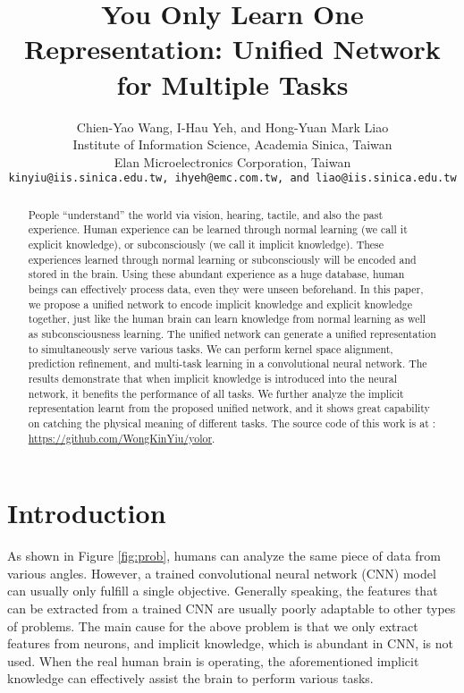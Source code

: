 \documentclass[10pt,twocolumn,letterpaper]{article}
\begin{document}
\title{You Only Learn One Representation: Unified Network for Multiple Tasks}

\author{Chien-Yao Wang, I-Hau Yeh, and Hong-Yuan Mark Liao \\
	Institute of Information Science, Academia Sinica, Taiwan\\
	Elan Microelectronics Corporation, Taiwan\\
	{\tt\small kinyiu@iis.sinica.edu.tw, ihyeh@emc.com.tw, and liao@iis.sinica.edu.tw}
}

\maketitle


\begin{abstract}
	People ``understand'' the world via vision, hearing, tactile, and also the past experience. Human experience can be learned through normal learning (we call it explicit knowledge), or subconsciously (we call it implicit knowledge). These experiences learned through normal learning or subconsciously will be encoded and stored in the brain. Using these abundant experience as a huge database, human beings can effectively process data, even they were unseen beforehand. In this paper, we propose a unified network to encode implicit knowledge and explicit knowledge together, just like the human brain can learn knowledge from normal learning as well as subconsciousness learning. The unified network can generate a unified representation to simultaneously serve various tasks. We can perform kernel space alignment, prediction refinement, and multi-task learning in a convolutional neural network. The results demonstrate that when implicit knowledge is introduced into the neural network, it benefits the performance of all tasks. We further analyze the implicit representation learnt from the proposed unified network, and it shows great capability on catching the physical meaning of different tasks. The source code of this work is at : \url{https://github.com/WongKinYiu/yolor}.
\end{abstract}

\section{Introduction}

As shown in Figure \ref{fig:prob}, humans can analyze the same piece of data from various angles. However, a trained convolutional neural network (CNN) model can usually only fulfill a single objective. Generally speaking, the features that can be extracted from a trained CNN are usually poorly adaptable to other types of problems. The main cause for the above problem is that we only extract features from neurons, and implicit knowledge, which is abundant in CNN, is not used. When the real human brain is operating, the aforementioned implicit knowledge can effectively assist the brain to perform various tasks.
\end{document}
